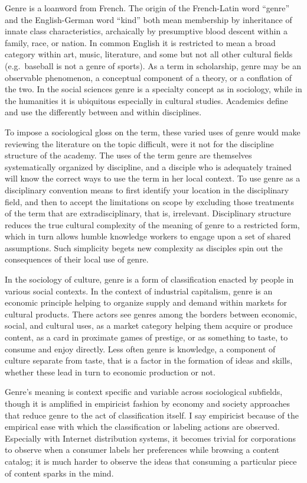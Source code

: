 \documentclass[]{book}
\theoremstyle{definition}
\theoremstyle{definition}
\theoremstyle{definition}
\theoremstyle{remark}
\begin{document}
Genre is a loanword from French. The origin of the French-Latin word
``genre'' and the English-German word ``kind'' both mean membership by
inheritance of innate class characteristics, archaically by presumptive
blood descent within a family, race, or nation. In common English it is
restricted to mean a broad category within art, music, literature, and
some but not all other cultural fields (e.g.~baseball is not a genre of
sports). As a term in scholarship, genre may be an observable
phenomenon, a conceptual component of a theory, or a conflation of the
two. In the social sciences genre is a specialty concept as in
sociology, while in the humanities it is ubiquitous especially in
cultural studies. Academics define and use the differently between and
within disciplines.

To impose a sociological gloss on the term, these varied uses of genre
would make reviewing the literature on the topic difficult, were it not
for the discipline structure of the academy. The uses of the term genre
are themselves systematically organized by discipline, and a disciple
who is adequately trained will know the correct ways to use the term in
her local context. To use genre as a disciplinary convention means to
first identify your location in the disciplinary field, and then to
accept the limitations on scope by excluding those treatments of the
term that are extradisciplinary, that is, irrelevant. Disciplinary
structure reduces the true cultural complexity of the meaning of genre
to a restricted form, which in turn allows humble knowledge workers to
engage upon a set of shared assumptions. Such simplicity begets new
complexity as disciples spin out the consequences of their local use of
genre.

In the sociology of culture, genre is a form of classification enacted
by people in various social contexts. In the context of industrial
capitalism, genre is an economic principle helping to organize supply
and demand within markets for cultural products. There actors see genres
among the borders between economic, social, and cultural uses, as a
market category helping them acquire or produce content, as a card in
proximate games of prestige, or as something to taste, to consume and
enjoy directly. Less often genre is knowledge, a component of culture
separate from taste, that is a factor in the formation of ideas and
skills, whether these lead in turn to economic production or not.

Genre's meaning is context specific and variable across sociological
subfields, though it is amplified in empiricist fashion by economy and
society approaches that reduce genre to the act of classification
itself. I say empiricist because of the empirical ease with which the
classification or labeling actions are observed. Especially with
Internet distribution systems, it becomes trivial for corporations to
observe when a consumer labels her preferences while browsing a content
catalog; it is much harder to observe the ideas that consuming a
particular piece of content sparks in the mind.
\end{document}

